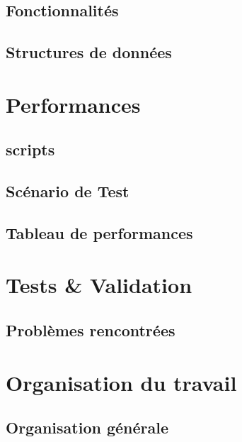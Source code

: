 \documentclass{article}
\begin{document}
    \subsection{Fonctionnalités}
    \subsection{Structures de données}
\section{Performances}
    \subsection{scripts}
    \subsection{Scénario de Test}
    \subsection{Tableau de performances}



\section{Tests \& Validation}
    \subsection{Problèmes rencontrées}
\section{Organisation du travail}
    \subsection{Organisation générale}
\end{document}
